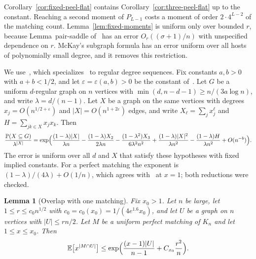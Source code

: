 \documentclass[11pt]{article}
\newtheorem{lemma}[theorem]{Lemma}
\newcommand{\EE}{\mathbb{E}}
\newcommand{\PP}{\mathbb{P}}
\begin{document}
Corollary~\ref{cor:fixed-peel-flat} contains Corollary~\ref{cor:three-peel-flat}
up to the constant.
Reaching a second moment of \(P_{L-1}\) costs a moment of order
\(2\cdot4^{L-2}\) of the matching count. Lemma~\ref{lem:fixed-moments}
is uniform only over bounded \(r\), because Lemma~pair-saddle
of~\cite{PlusOneV1} has an error \(O_r((\sigma+1)/n)\) with unspecified
dependence on \(r\).
McKay's subgraph formula has an error uniform over all hosts of polynomially
small degree, and it removes this restriction.

We use~\cite[Corollary~5]{McK11}, which specializes~\cite[Theorem~3]{McK11}
to regular degree sequences.
Fix constants \(a,b>0\) with \(a+b<1/2\), and let \(\varepsilon=\varepsilon(a,b)>0\)
be the constant of~\cite[Theorem~3]{McK11}.
Let \(G\) be a uniform \(d\)-regular graph on \(n\) vertices with
\(\min(d,n-d-1)\ge n/(3a\log n)\), and write \(\lambda=d/(n-1)\).
Let \(X\) be a graph on the same vertices with degrees \(x_j=O(n^{1/2+\varepsilon})\)
and \(|X|=O(n^{1+2\varepsilon})\) edges, and write
\(X_\ell=\sum_jx_j^\ell\) and \(H=\sum_{jk\in X}x_jx_k\).
Then
\begin{equation}
\label{eq:mckay-hit}
\frac{\PP(X\subseteq G)}{\lambda^{|X|}}
=
\exp\Bigl(
\frac{(1-\lambda)|X|}{\lambda n}
-\frac{(1-\lambda)X_2}{2\lambda n}
-\frac{(1-\lambda^2)X_3}{6\lambda^2n^2}
+\frac{(1-\lambda)|X|^2}{\lambda n^2}
-\frac{(1-\lambda)H}{\lambda n^2}
+O(n^{-b})\Bigr).
\end{equation}
The error is uniform over all \(d\) and \(X\) that satisfy these hypotheses
with fixed implied constants.
For a perfect matching the exponent is \((1-\lambda)/(4\lambda)+O(1/n)\),
which agrees with~\cite[Corollary~6]{McK11} at \(x=1\); both reductions were
checked.

\begin{lemma}[Overlap with one matching]
\label{lem:overlap-one}
Fix \(x_0>1\).
Let \(n\) be large, let \(1\le r\le c_0n^{1/2}\) with
\(c_0=c_0(x_0)=1/(4e^{1.6}x_0)\), and let \(U\) be a graph on
\(n\) vertices with \(|U|\le rn/2\).
Let \(M\) be a uniform perfect matching of \(K_n\) and let \(1\le x\le x_0\).
Then
\[
\EE\bigl[x^{|M\cap U|}\bigr]
\le
\exp\Bigl(\frac{(x-1)|U|}{n-1}+C_{x_0}\frac{r^2}{n}\Bigr).
\]
\end{lemma}
\end{document}
